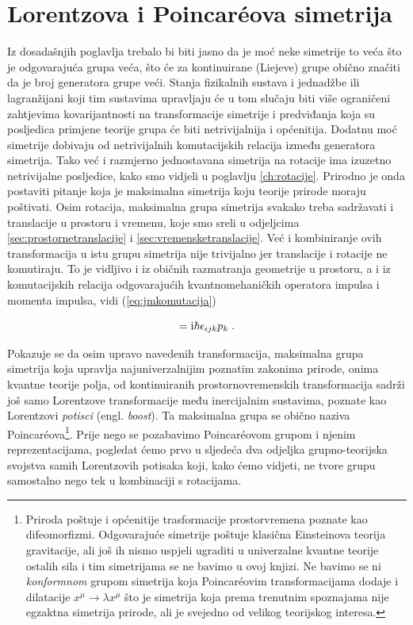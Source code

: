 
\chapter{Lorentzova i Poincar\'{e}ova simetrija}

Iz dosadašnjih poglavlja trebalo bi biti jasno da je moć
neke simetrije to veća što je odgovarajuća grupa veća, što
će za kontinuirane (Liejeve) grupe obično značiti da je broj generatora
grupe veći. Stanja fizikalnih sustava i jednadžbe ili lagranžijani
koji tim sustavima upravljaju
će u tom slučaju biti više ograničeni zahtjevima kovarijantnosti
na transformacije simetrije i predviđanja koja su posljedica
primjene teorije grupa će biti netrivijalnija i općenitija.
Dodatnu moć simetrije dobivaju od netrivijalnih komutacijskih
relacija između generatora simetrija.
Tako već i razmjerno jednostavana simetrija na rotacije ima izuzetno
netrivijalne posljedice, kako smo vidjeli u poglavlju \ref{ch:rotacije}.
Prirodno je onda postaviti pitanje koja je maksimalna
simetrija koju teorije prirode moraju poštivati. Osim rotacija,
maksimalna grupa simetrija svakako treba sadržavati i translacije
u prostoru i vremenu, koje smo sreli u odjeljcima
\ref{sec:prostornetranslacije} i \ref{sec:vremensketranslacije}.
Već i kombiniranje ovih transformacija u istu grupu simetrija
nije trivijalno jer translacije i rotacije ne komutiraju. To je
vidljivo i iz običnih razmatranja geometrije u prostoru, a i iz 
komutacijskih relacija odgovarajućih
kvantnomehaničkih operatora impulsa i momenta impulsa,
vidi (\ref{eq:jmkomutacija}) 

\begin{equation}
    [J_{i}, p_{j}] = \rmi \hbar \epsilon_{ijk} p_{k} \;.
    \label{eq:jpkomutacijske}
\end{equation}

Pokazuje se da osim upravo navedenih transformacija, maksimalna
grupa simetrija koja upravlja najuniverzalnijim poznatim zakonima
prirode, onima kvantne teorije polja, od kontinuiranih prostornovremenskih
transformacija sadrži još samo Lorentzove transformacije među inercijalnim sustavima,
poznate kao Lorentzovi \emph{potisci} (engl. \emph{boost}).
Ta maksimalna grupa se obično naziva Poincar\'{e}ova\footnote{Priroda poštuje
    i općenitije trasformacije prostorvremena poznate kao difeomorfizmi. 
    Odgovarajuće simetrije poštuje klasična Einsteinova teorija gravitacije, ali još
    ih nismo uspjeli ugraditi u univerzalne kvantne teorije ostalih sila i
    tim simetrijama se ne bavimo u ovoj knjizi. Ne bavimo se ni \emph{konformnom}
    grupom simetrija koja Poincar\'{e}ovim transformacijama dodaje i
    dilatacije $x^{\mu}\to\lambda x^{\mu}$ što je simetrija koja prema
    trenutnim spoznajama nije egzaktna simetrija prirode,
    ali je svejedno od velikog teorijskog interesa.}.
Prije nego se pozabavimo Poincar\'{e}ovom grupom i njenim reprezentacijama,
pogledat ćemo prvo u sljedeća dva odjeljka grupno-teorijska svojstva samih
Lorentzovih potisaka koji, kako ćemo vidjeti, ne tvore grupu samostalno
nego tek u kombinaciji s rotacijama.


